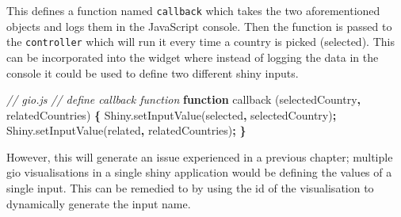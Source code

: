 \documentclass[
]{krantz}
\makeatletter
\newenvironment{Shaded}{\begin{snugshade}}{\end{snugshade}}
\newcommand{\AttributeTok}[1]{\textcolor[rgb]{0.61,0.61,0.61}{#1}}
\newcommand{\CommentTok}[1]{\textcolor[rgb]{0.37,0.37,0.37}{\textit{#1}}}
\newcommand{\KeywordTok}[1]{\textcolor[rgb]{0.27,0.27,0.27}{\textbf{#1}}}
\newcommand{\NormalTok}[1]{#1}
\newcommand{\OperatorTok}[1]{\textcolor[rgb]{0.43,0.43,0.43}{\textbf{#1}}}
\newcommand{\StringTok}[1]{\textcolor[rgb]{0.5,0.5,0.5}{#1}}
\newcommand{\VariableTok}[1]{\textcolor[rgb]{0,0,0}{#1}}
\newenvironment{kframe}{%
\medskip{}
\setlength{\fboxsep}{.8em}
 \def\at@end@of@kframe{}%
 \ifinner\ifhmode%
  \def\at@end@of@kframe{\end{minipage}}%
  \begin{minipage}{\columnwidth}%
 \fi\fi%
 \def\FrameCommand##1{\hskip\@totalleftmargin \hskip-\fboxsep
 \colorbox{shadecolor}{##1}\hskip-\fboxsep
     \hskip-\linewidth \hskip-\@totalleftmargin \hskip\columnwidth}%
 \MakeFramed {\advance\hsize-\width
   \@totalleftmargin\z@ \linewidth\hsize
   \@setminipage}}%
 {\par\unskip\endMakeFramed%
 \at@end@of@kframe}
\renewenvironment{Shaded}{\begin{kframe}}{\end{kframe}}
\makeatother
\begin{document}
This defines a function named \texttt{callback} which takes the two aforementioned objects and logs them in the JavaScript console. Then the function is passed to the \texttt{controller} which will run it every time a country is picked (selected). This can be incorporated into the widget where instead of logging the data in the console it could be used to define two different shiny inputs.

\begin{Shaded}
\begin{Highlighting}[]
\CommentTok{// gio.js}
\CommentTok{// define callback function}
\KeywordTok{function} \AttributeTok{callback}\NormalTok{ (selectedCountry}\OperatorTok{,}\NormalTok{ relatedCountries) }\OperatorTok{\{}
  \VariableTok{Shiny}\NormalTok{.}\AttributeTok{setInputValue}\NormalTok{(}\StringTok{\textquotesingle{}selected\textquotesingle{}}\OperatorTok{,}\NormalTok{ selectedCountry)}\OperatorTok{;}
  \VariableTok{Shiny}\NormalTok{.}\AttributeTok{setInputValue}\NormalTok{(}\StringTok{\textquotesingle{}related\textquotesingle{}}\OperatorTok{,}\NormalTok{ relatedCountries)}\OperatorTok{;}
\OperatorTok{\}}
\end{Highlighting}
\end{Shaded}

However, this will generate an issue experienced in a previous chapter; multiple gio visualisations in a single shiny application would be defining the values of a single input. This can be remedied to by using the id of the visualisation to dynamically generate the input name.
\end{document}
